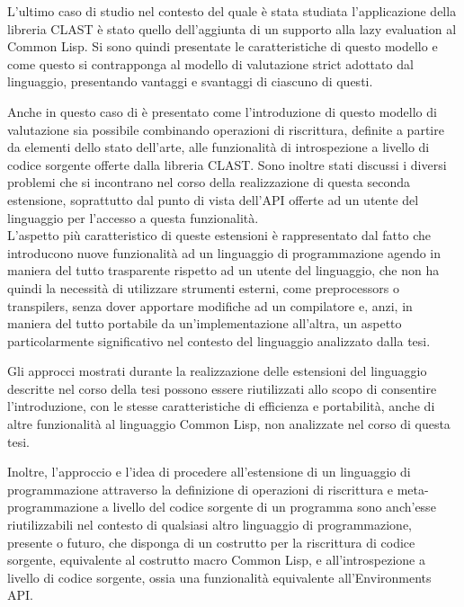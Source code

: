 \documentclass{book}
\begin{document}
L'ultimo caso di studio nel contesto del quale è stata studiata l'applicazione
della libreria CLAST è stato quello dell'aggiunta di un supporto alla lazy
evaluation al Common Lisp. Si sono quindi presentate le caratteristiche di
questo modello e come questo si contrapponga al modello di valutazione strict
adottato dal linguaggio, presentando vantaggi e svantaggi di ciascuno di questi.

Anche in questo caso di è presentato come l'introduzione di questo modello di
valutazione sia possibile combinando operazioni di riscrittura, definite a
partire da elementi dello stato dell'arte, alle funzionalità di introspezione a
livello di codice sorgente offerte dalla libreria CLAST. Sono inoltre stati
discussi i diversi problemi che si incontrano nel corso della realizzazione di
questa seconda estensione, soprattutto dal punto di vista dell'API offerte ad un
utente del linguaggio per l'accesso a questa funzionalità.\\

L'aspetto più caratteristico di queste estensioni è rappresentato dal fatto che
introducono nuove funzionalità ad un linguaggio di programmazione agendo in
maniera del tutto trasparente rispetto ad un utente del linguaggio, che non ha
quindi la necessità di utilizzare strumenti esterni, come preprocessors o
transpilers, senza dover apportare modifiche ad un compilatore e, anzi, in
maniera del tutto portabile da un'implementazione all'altra, un aspetto
particolarmente significativo nel contesto del linguaggio analizzato dalla tesi.

Gli approcci mostrati durante la realizzazione delle estensioni del linguaggio
descritte nel corso della tesi possono essere riutilizzati allo scopo di
consentire l'introduzione, con le stesse caratteristiche di efficienza e
portabilità, anche di altre funzionalità al linguaggio Common Lisp, non
analizzate nel corso di questa tesi.

Inoltre, l'approccio e l'idea di procedere all'estensione di un linguaggio di
programmazione attraverso la definizione di operazioni di riscrittura e
meta-programmazione a livello del codice sorgente di un programma sono anch'esse
riutilizzabili nel contesto di qualsiasi altro linguaggio di programmazione,
presente o futuro, che disponga di un costrutto per la riscrittura di codice
sorgente, equivalente al costrutto macro Common Lisp, e all'introspezione a
livello di codice sorgente, ossia una funzionalità equivalente all'Environments
API.

\printbibliography[filter=papers,title={Articoli Citati}]
\printbibliography[type=book,title={Bibliografia}]
\printbibliography[type=misc,title={Sitografia}]
\end{document}
